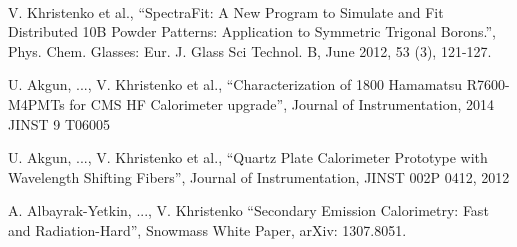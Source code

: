 \documentclass[11pt, letterpaper]{deps1}
\begin{document}
\vspace{5pt}
 \vspace{-10pt} \\

\begin{tightitemize}
    \item V. Khristenko et al., ``SpectraFit: A New Program to Simulate and Fit Distributed 10B Powder Patterns: Application to Symmetric Trigonal Borons.'', Phys. Chem. Glasses: Eur. J. Glass Sci Technol. B, June 2012, 53 (3), 121-127.
    \item U. Akgun, ..., V. Khristenko et al., ``Characterization of 1800 Hamamatsu R7600-M4PMTs for CMS HF Calorimeter upgrade'', Journal of Instrumentation, 2014 JINST 9 T06005
    \item U. Akgun, ..., V. Khristenko et al., ``Quartz Plate Calorimeter Prototype with Wavelength Shifting Fibers'', Journal of Instrumentation, JINST 002P 0412, 2012
    \item A. Albayrak-Yetkin, ..., V. Khristenko ``Secondary Emission Calorimetry: Fast and Radiation-Hard'', Snowmass White Paper, arXiv: 1307.8051.
\end{tightitemize}
\end{document}

